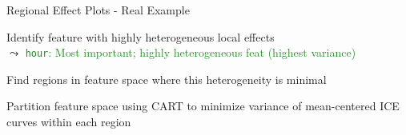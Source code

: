 \documentclass[10pt,compress,t,notes=noshow,xcolor=table]{beamer}
\begin{document}
\begin{framev}[align=top]{Regional Effect Plots - Real Example}
\begin{figure}
\centering
\end{figure}
\begin{itemizeM}
\item Identify feature with highly heterogeneous local effects\\
$\leadsto$ \textcolor{ForestGreen}{\texttt{hour}: Most important; highly heterogeneous feat (highest variance)}
\item Find regions in feature space where this heterogeneity is minimal
\begin{itemizeS}
\item[$\leadsto$] Partition feature space using CART to minimize variance of mean-centered ICE curves within each region
\end{itemizeS}
\end{itemizeM}
\end{framev}
\end{document}
